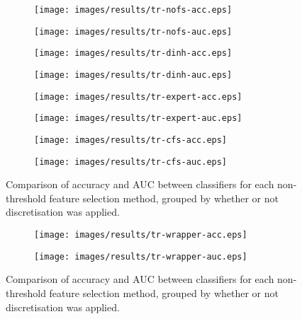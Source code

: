 \begin{figure}[htbp]
\begin{subfigure}{.48\textwidth}
\texttt{[image: images/results/tr-nofs-acc.eps]}
\caption{}
\label{}
\end{subfigure}%
\begin{subfigure}{.55\textwidth}
\texttt{[image: images/results/tr-nofs-auc.eps]}
\caption{}
\label{}
\end{subfigure}

\begin{subfigure}{.48\textwidth}
\texttt{[image: images/results/tr-dinh-acc.eps]}
\caption{}
\label{}
\end{subfigure}%
\begin{subfigure}{.55\textwidth}
\texttt{[image: images/results/tr-dinh-auc.eps]}
\caption{}
\label{}
\end{subfigure}

\begin{subfigure}{.48\textwidth}
\texttt{[image: images/results/tr-expert-acc.eps]}
\caption{}
\label{}
\end{subfigure}%
\begin{subfigure}{.55\textwidth}
\texttt{[image: images/results/tr-expert-auc.eps]}
\caption{}
\label{}
\end{subfigure}

\begin{subfigure}{.48\textwidth}
\texttt{[image: images/results/tr-cfs-acc.eps]}
\caption{}
\label{fig:tr-nothreshold-cfs-acc}
\end{subfigure}%
\begin{subfigure}{.55\textwidth}
\texttt{[image: images/results/tr-cfs-auc.eps]}
\caption{}
\label{}
\end{subfigure}
\caption{Comparison of accuracy and AUC between classifiers for each non-threshold feature selection method, grouped by whether or not discretisation was applied.}
\label{fig:tr-nothreshold}
\end{figure}

\begin{figure}
\ContinuedFloat

\begin{subfigure}{.48\textwidth}
\texttt{[image: images/results/tr-wrapper-acc.eps]}
\caption{}
\label{}
\end{subfigure}%
\begin{subfigure}{.55\textwidth}
\texttt{[image: images/results/tr-wrapper-auc.eps]}
\caption{}
\label{}
\end{subfigure}
\caption[]{Comparison of accuracy and AUC between classifiers for each non-threshold feature selection method, grouped by whether or not discretisation was applied.}
\label{}
\end{figure}

